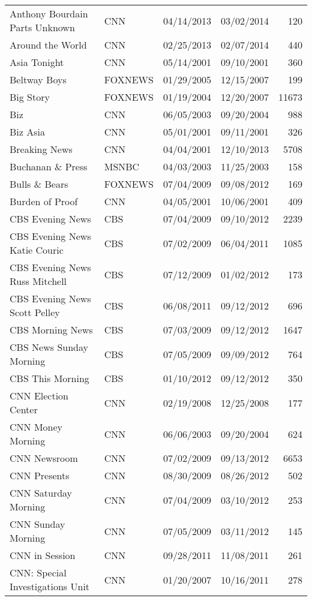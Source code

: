 {\begin{longtable}{llllr}
  Anthony Bourdain Parts Unknown & CNN & 04/14/2013 & 03/02/2014 & 120 \\ 
  Around the World & CNN & 02/25/2013 & 02/07/2014 & 440 \\ 
  Asia Tonight & CNN & 05/14/2001 & 09/10/2001 & 360 \\ 
  Beltway Boys & FOXNEWS & 01/29/2005 & 12/15/2007 & 199 \\ 
  Big Story & FOXNEWS & 01/19/2004 & 12/20/2007 & 11673 \\ 
  Biz & CNN & 06/05/2003 & 09/20/2004 & 988 \\ 
  Biz Asia & CNN & 05/01/2001 & 09/11/2001 & 326 \\ 
  Breaking News & CNN & 04/04/2001 & 12/10/2013 & 5708 \\ 
  Buchanan \& Press & MSNBC & 04/03/2003 & 11/25/2003 & 158 \\ 
  Bulls \& Bears & FOXNEWS & 07/04/2009 & 09/08/2012 & 169 \\ 
  Burden of Proof & CNN & 04/05/2001 & 10/06/2001 & 409 \\ 
  CBS Evening News & CBS & 07/04/2009 & 09/10/2012 & 2239 \\ 
  CBS Evening News Katie Couric & CBS & 07/02/2009 & 06/04/2011 & 1085 \\ 
  CBS Evening News Russ Mitchell & CBS & 07/12/2009 & 01/02/2012 & 173 \\ 
  CBS Evening News Scott Pelley & CBS & 06/08/2011 & 09/12/2012 & 696 \\ 
  CBS Morning News & CBS & 07/03/2009 & 09/12/2012 & 1647 \\ 
  CBS News Sunday Morning & CBS & 07/05/2009 & 09/09/2012 & 764 \\ 
  CBS This Morning & CBS & 01/10/2012 & 09/12/2012 & 350 \\ 
  CNN Election Center & CNN & 02/19/2008 & 12/25/2008 & 177 \\ 
  CNN Money Morning & CNN & 06/06/2003 & 09/20/2004 & 624 \\ 
  CNN Newsroom & CNN & 07/02/2009 & 09/13/2012 & 6653 \\ 
  CNN Presents & CNN & 08/30/2009 & 08/26/2012 & 502 \\ 
  CNN Saturday Morning & CNN & 07/04/2009 & 03/10/2012 & 253 \\ 
  CNN Sunday Morning & CNN & 07/05/2009 & 03/11/2012 & 145 \\ 
  CNN in Session & CNN & 09/28/2011 & 11/08/2011 & 261 \\ 
  CNN: Special Investigations Unit & CNN & 01/20/2007 & 10/16/2011 & 278 \\ 

\end{longtable}}
